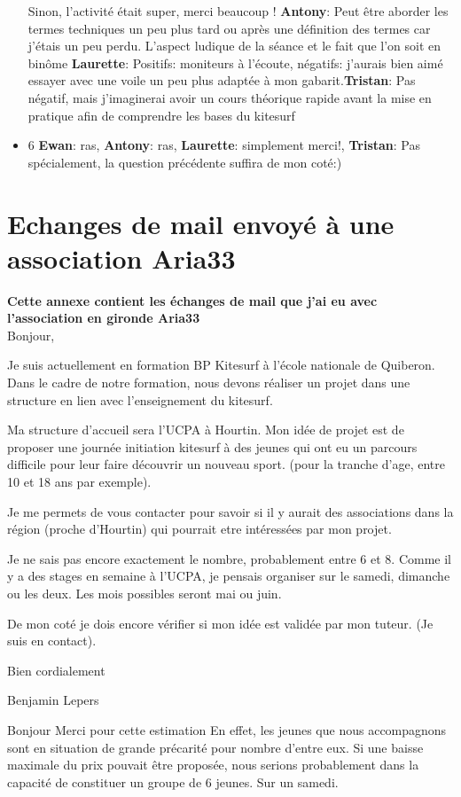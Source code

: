 \documentclass[11pt,a4paper]{report}
\begin{document}
\begin{itemize}
Sinon, l'activité était super, merci beaucoup !
\textbf{Antony}: Peut \^etre aborder les termes techniques un 
peu plus tard ou après une définition des termes car j'étais un
peu perdu. L'aspect ludique de la séance et le fait que l'on
soit en bin\^ome \textbf{Laurette}: Positifs: moniteurs à
l'écoute, négatifs: j'aurais bien aimé essayer avec une
voile un peu plus adaptée à mon gabarit.\textbf{Tristan}: 
Pas négatif, mais j'imaginerai avoir un cours théorique rapide avant
la mise en pratique afin de comprendre les bases du kitesurf
\item 6 \textbf{Ewan}: ras, \textbf{Antony}: ras, 
\textbf{Laurette}: simplement merci!, \textbf{Tristan}: 
Pas spécialement, la question précédente suffira de mon coté:)
\end{itemize}


\chapter{Echanges de mail envoyé à une association Aria33}\label{appendix_mail}
\textbf{Cette annexe contient les échanges de mail que j'ai eu avec l'association 
en gironde Aria33\cite{aria33}} \\

Bonjour,

Je suis actuellement en formation BP Kitesurf à l'école nationale de Quiberon.
Dans le cadre de notre formation, nous devons réaliser un projet dans
une structure en lien avec l'enseignement du kitesurf.

Ma structure d'accueil sera l'UCPA à Hourtin.
Mon idée de projet est de proposer une journée initiation kitesurf à
des jeunes qui ont eu un parcours difficile pour leur faire découvrir
un nouveau sport.
(pour la tranche d'age, entre 10 et 18 ans par exemple).

Je me permets de vous contacter pour savoir si il y aurait des
associations dans la région (proche d'Hourtin) qui pourrait etre
intéressées par mon projet.

Je ne sais pas encore exactement le nombre, probablement entre 6 et 8.
Comme il y a des stages en semaine à l'UCPA, je pensais organiser sur
le samedi, dimanche ou les deux. Les mois possibles seront mai ou
juin.

De mon coté je dois encore vérifier si mon idée est validée par mon
tuteur. (Je suis en contact).


Bien cordialement

Benjamin Lepers

\bigskip
Bonjour
Merci pour cette estimation
En effet, les jeunes que nous accompagnons sont en situation de grande
précarité pour nombre d'entre eux. Si une baisse maximale du prix
pouvait être proposée, nous serions probablement dans la capacité
de constituer un groupe de 6 jeunes. Sur un samedi.
\end{document}
